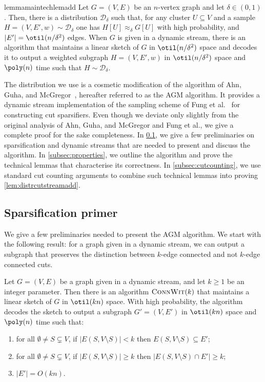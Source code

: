 \begin{restatable}{lemma}{maintechlemadd}
	\label{lem:distrcutstreamadd}
	Let $G=(V,E)$ be an $n$-vertex graph and let $\delta \in (0,1)$. Then, there is a distribution $\mathcal{D}_\delta$ such that, for any cluster $U \subseteq V$ and a sample $H=(V,E',w)  \sim \mathcal{D}_\delta$ one has $H[U] \approx_\delta G[U]$ with high probability, and $|E'| = \otil(n/\delta^2)$ edges. When $G$ is given in a dynamic stream, there is an algorithm that maintains a linear sketch of $G$ in $\otil(n/\delta^2)$ space and decodes it to output a weighted subgraph $H=(V,E',w)$  in $\otil(n/\delta^2)$ space and $\poly(n)$ time such that $H \sim  \mathcal{D}_\delta$.
\end{restatable}
\noindent
The distribution  we use is a cosmetic modification of the algorithm of Ahn, Guha, and McGregor~\cite{sparsdynamicstreams}, hereafter referred to as the AGM algorithm. It provides a dynamic stream implementation of the sampling scheme of Fung et al.~\cite{fungspars} for constructing cut sparsifiers. Even though we deviate only slightly from the original analysis of Ahn, Guha, and McGregor and Fung et al., we give a complete proof for the sake completeness. In \cref{subsec:primer}, we give a few preliminaries on sparsification and dynamic streams that are needed to present and discuss the algorithm. In \cref{subsec:properties}, we outline the algorithm and prove the technical lemmas that characterise its correctness. In \cref{subsec:cutcounting}, we use standard cut counting arguments to combine such technical lemmas into proving \cref{lem:distrcutstreamadd}.

\subsection{Sparsification primer}
\label{subsec:primer}
We give a few preliminaries needed to present the AGM algorithm. We start with the following result: for a graph given in a dynamic stream, we can output a subgraph that preserves the distinction between $k$-edge connected and not $k$-edge connected cuts.

\begin{theorem}
	\label{th:connwit}
	Let $G=(V,E)$ be a graph given in a dynamic stream, and let $k \ge 1$ be an integer parameter. Then there is an algorithm $\textsc{ConnWit}(k)$ that maintains a linear sketch of $G$ in $\otil(kn)$ space. With high probability, the algorithm decodes the sketch to output a subgraph $G'=(V,E')$ in $\otil(kn)$ space and $\poly(n)$ time such that:
	\begin{enumerate}
		\item for all $\emptyset \neq S \subsetneq V$, if $|E(S,V\setminus S)| < k$ then $E(S, V \setminus S) \subseteq E'$;
		\item for all $\emptyset \neq S \subsetneq V$, if $|E(S,V\setminus S)| \ge k$ then $|E(S, V \setminus S) \cap E'|\ge k$;
		\item $|E'|=O(kn)$.
	\end{enumerate}
\end{theorem}

